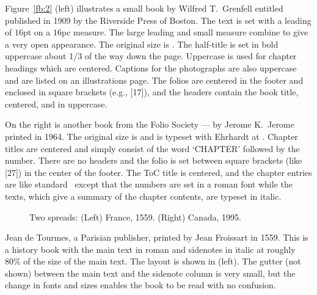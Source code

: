 \documentclass[10pt,letterpaper,extrafontsizes]{memoir}
\begin{document}
    Figure~\ref{fb:2} (left) illustrates a small book by Wilfred T.~Grenfell
entitled  published in 1909 by the Riverside
Press of Boston. The text is set with a leading 
of $16$pt on a $16$pc 
measure. The large leading and small measure combine to give a very 
open appearance. The original size is . 
 The half-title is set in 
bold uppercase about 1/3
of the way down the page. Uppercase is used for chapter
headings which are centered. Captions for the photographs
are also uppercase and are listed on an illustrations page. 
The folios are
centered in the footer and enclosed in square 
brackets (e.g., [17]), and the
headers contain the book title, centered, 
and in uppercase.



On the right is another book from the
Folio Society ---  
by Jerome K.~Jerome printed
in 1964. The original size is  and is typeset with
Ehrhardt at . 
Chapter titles are
centered and simply consist of  the word `CHAPTER' followed by the number.
There are no headers and the folio 
is set between square brackets (like [27])
in the center of the footer. The ToC
title is centered, and the chapter entries are like standard \ltx\ except
that the numbers are set in a roman font while the texts, which give a 
summary of the chapter contents, are typeset in italic.

\begin{figure}
\centering
\begin{minipage}[b]{\pwlayi}
\end{minipage}
\hfill
\begin{minipage}[b]{\pwlayi}
\end{minipage}
\caption[Two spreads: France, 1559 and Canada, 1995]%
        {Two spreads: (Left) France, 1559.
         (Right) Canada, 1995.} \label{fb:3}
\end{figure}

   Jean de Tourmes, a Parisian publisher, 
printed 
by Jean Froissart in 1559. This is a history book with the main text in
roman and sidenotes in italic at roughly 80\% of the size of the main text.
The layout is shown in  (left). The gutter (not shown) between 
the main text and the sidenote column 
is very small, 
but the change in fonts and sizes enables the book to be read with no 
confusion. 
\end{document}
